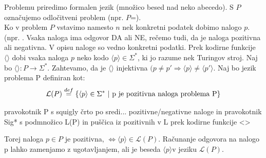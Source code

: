 \documentclass[10pt,a4paper,oneside]{book}
\begin{document}
Problemu priredimo formalen jezik (množico besed nad neko abecedo).
\br
S $P$ označujemo odločitveni problem (npr. $P$=).\\
Ko v problem $P$ vstavimo namesto $n$ nek konkretni podatek dobimo nalogo $p$. (npr. . Vsaka naloga ima odgovor DA ali NE, rečemo tudi, da je naloga pozitivna ali negativna.
V opisu naloge so vedno konkretni podatki.
Prek kodirne funkcije $\langle\rangle$ dobi vsaka naloga $p$ neko kodo $\langle p\rangle\in\Sigma^*$, ki jo razume nek Turingov stroj.
Naj bo $\langle \rangle :P\rightarrow \Sigma^*$. Zahtevamo, da je $\langle\rangle$ injektivna $(p \neq p' \Rightarrow \langle p \rangle \neq \langle p' \rangle$.%
Naj bo jezik problema P definiran kot:
\[ \mathcal{L}(P) \overset{def}{=} \{ \langle p \rangle \in \Sigma^*\ |\ \mbox{p je pozitivna naloga problema P} \} \]

\fixme pravokotnik P s squigly črto po sredi... pozitivne/negativne naloge in pravokotnik Sig* s podmnožico L(P) in puščica iz pozitivnih v L prek kodirne funkcije <>

Torej naloga $p\in P$ je pozitivna, $\Leftrightarrow \langle p \rangle \in \mathcal{L}(P)$.
Računanje odgovora na nalogo p lahko zamenjamo z ugotavljanjem, ali je beseda $\langle p \rangle$v jeziku $\mathcal{L}(P)$.
\end{document}

